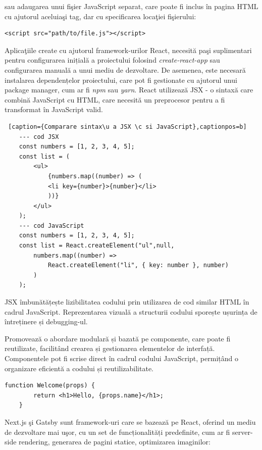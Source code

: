 \documentclass[12pt, a4paper]{report}
\begin{document}
sau adaugarea unui fi\c sier JavaScript separat, care poate fi inclus \^ in pagina HTML cu ajutorul aceluia\c si tag, dar cu specificarea loca\c tiei fi\c sierului:

\begin{lstlisting}[caption={Exemplu de ad\u augare a unui script dintr-un fi\c sier extern},captionpos=b]
	<script src="path/to/file.js"></script>
\end{lstlisting}

Aplica\c tiile create cu ajutorul framework-urilor React, necesit\u a pa\c si suplimentari pentru configurarea inițială a proiectului folosind \textit{create-react-app} sau configurarea manuală a unui mediu de dezvoltare. De asemenea, este necesar\u a instalarea dependențelor proiectului, care pot fi gestionate cu ajutorul unui package manager, cum ar fi \textit{npm} sau \textit{yarn}. React utilizează JSX - o sintaxă care combină JavaScript cu HTML, care necesită un preprocesor pentru a fi transformat în JavaScript valid.

\begin{lstlisting} [caption={Comparare sintax\u a JSX \c si JavaScript},captionpos=b]
	--- cod JSX
	const numbers = [1, 2, 3, 4, 5];
	const list = (
		<ul>
			{numbers.map((number) => (
			<li key={number}>{number}</li>
			))}
		</ul>
	);
	--- cod JavaScript
	const numbers = [1, 2, 3, 4, 5];
	const list = React.createElement("ul",null,
		numbers.map((number) =>
			React.createElement("li", { key: number }, number)
		)
	);

\end{lstlisting}

JSX îmbunătățește lizibilitatea codului prin utilizarea de cod similar HTML în cadrul JavaScript. Reprezentarea vizuală a structurii codului sporește ușurința de întreținere și debugging-ul.

Promovează o abordare modulară și bazată pe componente, care poate fi reutilizate, facilit\^and crearea și gestionarea elementelor de interfață. Componentele pot fi scrise direct în cadrul codului JavaScript, permițând o organizare eficientă a codului și reutilizabilitate.

\begin{lstlisting}[caption={Exemplu de component\u a React},captionpos=b]
	function Welcome(props) {
		return <h1>Hello, {props.name}</h1>;
	}
\end{lstlisting}

Next.js \c si Gatsby sunt framework-uri care se bazeaz\u a pe React, oferind un mediu de dezvoltare mai u\c sor, cu un set de funcționalități predefinite, cum ar fi server-side rendering, generarea de pagini statice, optimizarea imaginilor:
\end{document}
